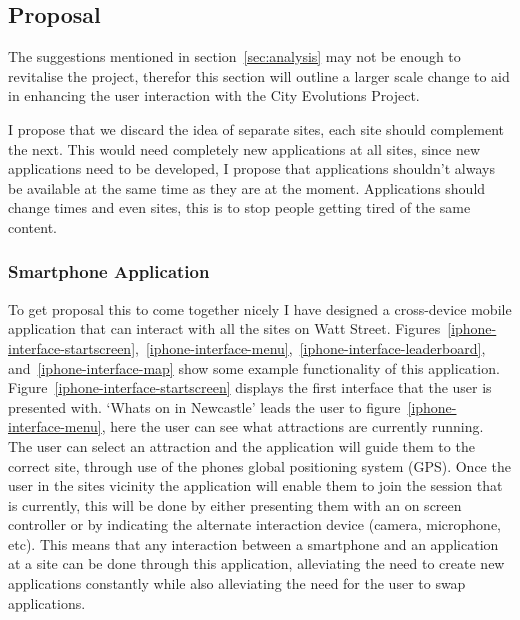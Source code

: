 \documentclass[a4paper,12pt]{article}
\begin{document}
\subsection{Proposal}
The suggestions mentioned in section~\ref{sec:analysis} may not be enough to revitalise the project, therefor this section will outline a larger scale change to aid in enhancing the user interaction with the City Evolutions Project.

I propose that we discard the idea of separate sites, each site should complement the next. 
This would need completely new applications at all sites, since new applications need to be developed, I propose that applications shouldn't always be available at the same time as they are at the moment.
Applications should change times and even sites, this is to stop people getting tired of the same content.

\subsubsection{Smartphone Application}
To get proposal this to come together nicely I have designed a cross-device mobile application that can interact with all the sites on Watt Street.
Figures~\ref{iphone-interface-startscreen},~\ref{iphone-interface-menu},~\ref{iphone-interface-leaderboard}, and~\ref{iphone-interface-map} show some example functionality of this application.
Figure~\ref{iphone-interface-startscreen} displays the first interface that the user is presented with. `Whats on in Newcastle' leads the user to figure~\ref{iphone-interface-menu}, here the user can see what attractions are currently running. 
The user can select an attraction and the application will guide them to the correct site, through use of the phones global positioning system (GPS).
Once the user in the sites vicinity the application will enable them to join the session that is currently, this will be done by either presenting them with an on screen controller or by indicating the alternate interaction device (camera, microphone, etc). 
This means that any interaction between a smartphone and an application at a site can be done through this application, alleviating the need to create new applications constantly while also alleviating the need for the user to swap applications.
\end{document}
